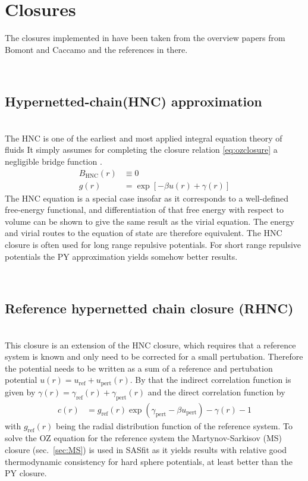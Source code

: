 \section{Closures}

The closures implemented in \SASfit have been taken from the overview papers from Bomont \cite{Bomont2008}
and Caccamo \cite{Caccamo1996} and the references in there.

~\\
\subsection{Hypernetted-chain(HNC) approximation}
\label{sec:HNC}~\\

The HNC is one of the earliest and most applied integral equation theory of fluids \cite{Hansen2013}
It simply assumes for completing the closure relation
\ref{eq:ozclosure} a negligible bridge function \cite{Caccamo1996,Bomont2008,Hansen2013}.
\begin{align} \label{eq:ozBHNC}
B_\text{HNC}(r) &\equiv 0 \\
g(r)&=\exp\left[ -\beta u(r) +\gamma(r)\right]
\end{align}
The HNC equation is a special case insofar as it corresponds to a
well-defined free-energy functional, and differentiation of that
free energy with respect to volume can be shown to give the same
result as the virial equation. The energy and virial routes to the
equation of state are therefore equivalent.
The HNC closure is often used for long range repulsive potentials.
For short range repulsive potentials the PY approximation yields
somehow better results.

\vphantom{.}~\\
\subsection{Reference hypernetted chain closure (RHNC)}
\label{sec:RHNC}~\\

This closure is an extension of the HNC closure, which requires that a reference system is known and only need to be corrected for a small pertubation. Therefore the potential needs to be written as a sum of a reference and pertubation potential $u(r)=u_\mathrm{ref}+u_\mathrm{pert}(r)$. By that the indirect correlation function is given by $\gamma(r)=\gamma_\mathrm{ref}(r)+\gamma_\mathrm{pert}(r)$ and the direct correlation function by
\begin{align}
c(r) &= g_\mathrm{ref}(r)\exp\left(\gamma_\mathrm{pert}-\beta u_\mathrm{pert}\right) - \gamma(r) -1
\end{align}
with $g_\mathrm{ref}(r)$ being the radial distribution function of the reference system. To solve the OZ equation for the reference system the Martynov-Sarkisov (MS) closure (sec.\ \ref{sec:MS}) is used in SASfit as it yields results with relative good thermodynamic consistency for hard sphere potentials, at least better than the PY closure.

